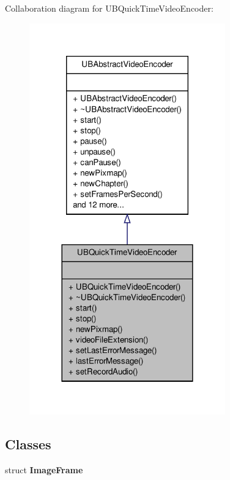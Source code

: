 Collaboration diagram for U\-B\-Quick\-Time\-Video\-Encoder\-:
\nopagebreak
\begin{figure}[H]
\begin{center}
\leavevmode
\includegraphics[width=240pt]{d1/de1/class_u_b_quick_time_video_encoder__coll__graph}
\end{center}
\end{figure}
\subsection*{Classes}
\begin{DoxyCompactItemize}
\item 
struct {\bfseries Image\-Frame}
\end{DoxyCompactItemize}

